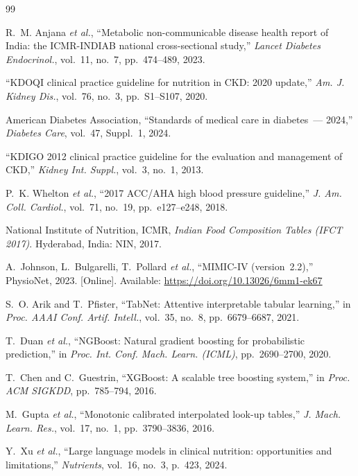 \documentclass[journal]{IEEEtran}
\begin{document}
\begin{thebibliography}{99}

R.~M. Anjana \textit{et al.}, ``Metabolic non-communicable disease
health report of India: the ICMR-INDIAB national cross-sectional study,''
\textit{Lancet Diabetes Endocrinol.}, vol.~11, no.~7, pp.~474--489, 2023.

``KDOQI clinical practice guideline for nutrition in CKD: 2020 update,''
\textit{Am. J. Kidney Dis.}, vol.~76, no.~3, pp.~S1--S107, 2020.

American Diabetes Association, ``Standards of medical care in
diabetes~--- 2024,'' \textit{Diabetes Care}, vol.~47, Suppl.~1, 2024.

``KDIGO 2012 clinical practice guideline for the evaluation and
management of CKD,'' \textit{Kidney Int. Suppl.}, vol.~3, no.~1, 2013.

P.~K. Whelton \textit{et al.}, ``2017 ACC/AHA high blood pressure
guideline,'' \textit{J. Am. Coll. Cardiol.}, vol.~71, no.~19,
pp.~e127--e248, 2018.

National Institute of Nutrition, ICMR, \textit{Indian Food Composition
Tables (IFCT 2017)}. Hyderabad, India: NIN, 2017.

A.~Johnson, L.~Bulgarelli, T.~Pollard \textit{et al.},
``MIMIC-IV (version~2.2),'' PhysioNet, 2023.
[Online]. Available: \url{https://doi.org/10.13026/6mm1-ek67}

S.~O. Arik and T.~Pfister, ``TabNet: Attentive interpretable tabular
learning,'' in \textit{Proc. AAAI Conf. Artif. Intell.}, vol.~35,
no.~8, pp.~6679--6687, 2021.

T.~Duan \textit{et al.}, ``NGBoost: Natural gradient boosting for
probabilistic prediction,'' in \textit{Proc. Int. Conf. Mach. Learn.
(ICML)}, pp.~2690--2700, 2020.

T.~Chen and C.~Guestrin, ``XGBoost: A scalable tree boosting system,''
in \textit{Proc. ACM SIGKDD}, pp.~785--794, 2016.

M.~Gupta \textit{et al.}, ``Monotonic calibrated interpolated look-up
tables,'' \textit{J. Mach. Learn. Res.}, vol.~17, no.~1,
pp.~3790--3836, 2016.

Y.~Xu \textit{et al.}, ``Large language models in clinical nutrition:
opportunities and limitations,'' \textit{Nutrients}, vol.~16, no.~3,
p.~423, 2024.

\end{thebibliography}
\end{document}
